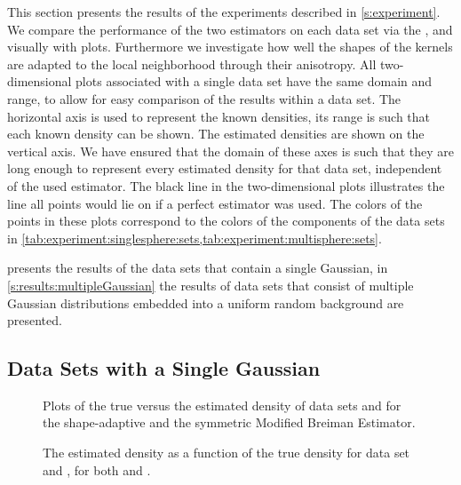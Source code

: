 
This section presents the results of the experiments described in \cref{s:experiment}.
We compare the performance of the two estimators on each data set via the \mse,  and visually with plots. Furthermore we investigate how well the shapes of the kernels are adapted to the local neighborhood through their anisotropy.
	All two-dimensional plots associated with a single data set have the same domain and range, to allow for easy comparison of the results within a data set. The horizontal axis is used to represent the known densities, its range is such that each known density can be shown. The estimated densities are shown on the vertical axis. We have ensured that the domain of these axes is such that they are long enough to represent every estimated density for that data set, independent of the used estimator.
	The black line in the two-dimensional plots illustrates the line all points would lie on if a perfect estimator was used.
	The colors of the points in these plots correspond to the colors of the components of the data sets in \cref{tab:experiment:singlesphere:sets,tab:experiment:multisphere:sets}.

	 presents the results of the data sets that contain a single Gaussian, in \cref{s:results:multipleGaussian} the results of data sets that consist of multiple Gaussian distributions embedded into a uniform random background are presented.

\subsection{Data Sets with a Single Gaussian}
\label{s:results:singleGaussian}


	\begin{figure*}[p]
		\centering
		
		\caption{Plots of the true versus the estimated density of data sets \ferdosiTwo and \baakmanTwo for the shape-adaptive and the symmetric Modified Breiman Estimator.}
		\label{fig:results:multiSphere:two:comparativePlots}
	\end{figure*}
	\begin{figure*}[p]
		\centering
		
		\caption{The estimated density as a function of the true density for data set \ferdosiThree and \baakmanThree, for both \mbe and \sambe.}
		\label{fig:results:multiSphere:three:comparativePlots}
	\end{figure*}

